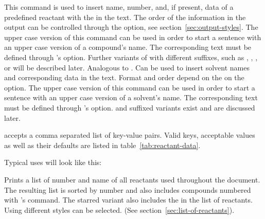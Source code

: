 \documentclass{chemmacros-manual}
\begin{document}
\begin{commands}
  This command is used to insert name, number, and, if present, data of a predefined 
  reactant with the  in the text. The order of the information in the output 
  can be controlled through the   option, see 
  section~\vref{sec:output-styles}.  The upper case version of this command 
  can be used in order to start a sentence with an upper case version of a compound's name. 
  The corresponding text must be defined through 's 
  option. Further variants of  with different suffixes, such as \code{*}, \code{+}, 
  ,  or  will be described later.
  Analogous to . Can be used to insert solvent names and corresponding 
  data in the text. Format and order depend on the on the  option. 
  The upper case version of this command  can be used in order to start a sentence 
  with an upper case version of a solvent's name. The corresponding text must be defined through 
  's  option.   and  suffixed 
  variants exist and are discussed later.
\end{commands}

 accepts a comma separated list of key-value pairs. Valid keys,
acceptable values as well as their defaults are listed in table~\vref{tab:reactant-data}.

Typical uses will look like this:
\begin{sourcecode}
\end{sourcecode}

\begin{commands}
   Prints a list of number and name of all reactants used
   throughout the document. The resulting list is sorted by number and also includes
   compounds numbered with 's  command. The starred variant 
   also includes the  in the list of reactants. Using  
   different styles can be selected. (See section~\vref{sec:list-of-reactants}).
\end{commands}
\end{document}
